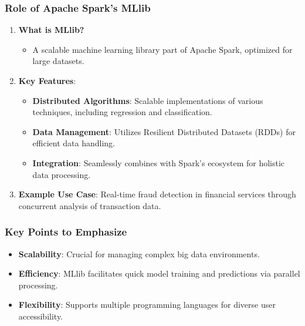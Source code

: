\documentclass[aspectratio=169]{beamer}
\begin{document}
\begin{frame}[fragile]
    \frametitle{Role of Apache Spark's MLlib}
    \begin{enumerate}
        \item \textbf{What is MLlib?} 
        \begin{itemize}
            \item A scalable machine learning library part of Apache Spark, optimized for large datasets.
        \end{itemize}

        \item \textbf{Key Features}:
        \begin{itemize}
            \item \textbf{Distributed Algorithms}: Scalable implementations of various techniques, including regression and classification.
            \item \textbf{Data Management}: Utilizes Resilient Distributed Datasets (RDDs) for efficient data handling.
            \item \textbf{Integration}: Seamlessly combines with Spark’s ecosystem for holistic data processing.
        \end{itemize}
    
        \item \textbf{Example Use Case}:
        Real-time fraud detection in financial services through concurrent analysis of transaction data.
    \end{enumerate}
\end{frame}

\begin{frame}[fragile]
    \frametitle{Key Points to Emphasize}
    \begin{itemize}
        \item \textbf{Scalability}: Crucial for managing complex big data environments.
        \item \textbf{Efficiency}: MLlib facilitates quick model training and predictions via parallel processing.
        \item \textbf{Flexibility}: Supports multiple programming languages for diverse user accessibility.
    \end{itemize}
\end{frame}
\end{document}
